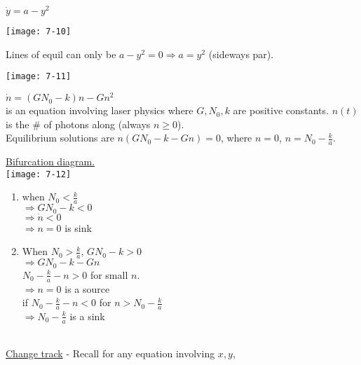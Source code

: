 \begin{example-N}
	$\dot{y} = a-y^2$
	\begin{center}
		\texttt{[image: 7-10]}
	\end{center}
	Lines of equil can only be $a-y^2 = 0 \Rightarrow a=y^2$ (sideways par).
	\begin{center}
		\texttt{[image: 7-11]}
	\end{center}
\end{example-N}
\begin{example-N}
	$\dot{n} = (GN_0 - k)n - Gn^2$\\
	is an equation involving laser physics where $G, N_0, k$ are positive constants. $n(t)$ is the \# of photons along (always $n \geq 0$).\\
	Equilibrium solutions are $n(GN_0 - k - Gn) = 0$, where $n = 0$, $n = N_0 - \frac{k}{a}$.
	\begin{center}
	\underline{Bifurcation diagram.}\\
		\texttt{[image: 7-12]}
	\end{center}
\end{example-N}
\begin{enumerate}[label=\protect\circled{\Roman*}]
	\item when $N_0 < \frac{k}{a}$\\
	$\Rightarrow GN_0 - k < 0$\\
	$\Rightarrow \dot{n} < 0$\\
	$\Rightarrow n = 0$ is sink
	\item When $N_0 > \frac{k}{a}$, $GN_0 - k > 0$\\
	$\Rightarrow GN_0 - k - Gn$\\
	$N_0 - \frac{k}{a} - n > 0$ for small $n$.\\
	$\Rightarrow n = 0$ is a source\\
	if $N_0 - \frac{k}{a} - n < 0$ for $n > N_0 - \frac{k}{a}$\\
	$\Rightarrow N_0 - \frac{k}{a}$ is a sink
\end{enumerate}
\redhline\\
{\large \underline{Change track}} - Recall for any equation involving $x,y$,
